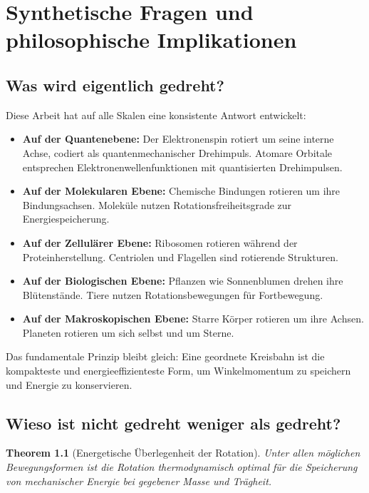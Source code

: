 \documentclass[12pt,a4paper]{report}
\theoremstyle{plain}
\newtheorem{theorem}{Theorem}[section]
\theoremstyle{definition}
\theoremstyle{remark}
\begin{document}
\chapter{Synthetische Fragen und philosophische Implikationen}

\section{Was wird eigentlich gedreht?}

Diese Arbeit hat auf alle Skalen eine konsistente Antwort entwickelt:

\begin{itemize}
	\item \textbf{Auf der Quantenebene:} Der Elektronenspin rotiert um seine interne Achse, codiert als quantenmechanischer Drehimpuls. Atomare Orbitale entsprechen Elektronenwellenfunktionen mit quantisierten Drehimpulsen.
	
	\item \textbf{Auf der Molekularen Ebene:} Chemische Bindungen rotieren um ihre Bindungsachsen. Moleküle nutzen Rotationsfreiheitsgrade zur Energiespeicherung.
	
	\item \textbf{Auf der Zellulärer Ebene:} Ribosomen rotieren während der Proteinherstellung. Centriolen und Flagellen sind rotierende Strukturen.
	
	\item \textbf{Auf der Biologischen Ebene:} Pflanzen wie Sonnenblumen drehen ihre Blütenstände. Tiere nutzen Rotationsbewegungen für Fortbewegung.
	
	\item \textbf{Auf der Makroskopischen Ebene:} Starre Körper rotieren um ihre Achsen. Planeten rotieren um sich selbst und um Sterne.
\end{itemize}

Das fundamentale Prinzip bleibt gleich: Eine geordnete Kreisbahn ist die kompakteste und energieeffizienteste Form, um Winkelmomentum zu speichern und Energie zu konservieren.

\section{Wieso ist nicht gedreht weniger als gedreht?}

\begin{theorem}[Energetische Überlegenheit der Rotation]
	Unter allen möglichen Bewegungsformen ist die Rotation thermodynamisch optimal für die Speicherung von mechanischer Energie bei gegebener Masse und Trägheit.
\end{theorem}
\end{document}
